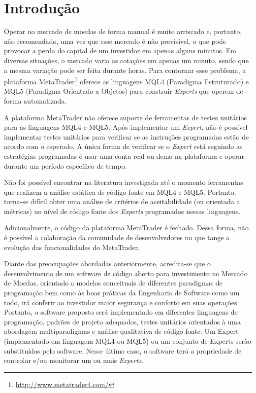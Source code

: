 \chapter{Introdução}

Operar no mercado de moedas de forma manual é muito arriscado e, portanto, não recomendado, uma vez que esse mercado é não previsível, o que pode provocar a perda do capital de um investidor em apenas alguns minutos. Em diversas situações, o mercado varia as cotações em apenas um minuto, sendo que a mesma variação pode ser feita durante horas. Para contornar esse problema, a plataforma MetaTrader\footnote{\url{http://www.metatrader4.com/}} oferece as linguagens MQL4 (Paradigma Estruturado) e MQL5 (Paradigma Orientado a Objetos) para construir \textit{Experts} que operem de forma automatizada. 

A plataforma MetaTrader não oferece suporte de ferramentas de testes unitários para as linguagens MQL4 e MQL5. Após implementar um \textit{Expert}, não é possível implementar testes unitários para verificar se as instruções programadas estão de acordo com o esperado. A única forma de verificar se o \textit{Expert} está seguindo as estratégias programadas é usar uma conta real ou demo na plataforma e operar durante um período específico de tempo.

Não foi possível encontrar na literatura investigada até o momento ferramentas que realizem a análise estática de código fonte em MQL4 e MQL5. Portanto, torna-se difícil obter uma análise de critérios de aceitabilidade (ou orientada a métricas) no nível de código fonte dos \textit{Experts} programados nessas linguagens.

Adicionalmente, o código da plataforma MetaTrader é fechado. Dessa forma, não é possível a colaboração da comunidade de desenvolvedores no que tange a evolução das funcionalidades do MetaTrader.

Diante das preocupações abordadas anteriormente, acredita-se que o desenvolvimento de um software de código aberto para investimento no Mercado de Moedas, orientado a modelos conceituais de diferentes paradigmas de programação bem como às boas práticas da Engenharia de Software como um todo, irá conferir ao investidor maior segurança e conforto em suas operações. Portanto, o software proposto será implementado em diferentes linguagens de programação, padrões de projeto adequados, testes unitários orientados à uma abordagem multiparadigmas e análise qualitativa de código fonte. Um Expert (implementado em linguagem MQL4 ou MQL5) ou um conjunto de Experts serão substituídos pelo software. Nesse último caso, o software terá a propriedade de controlar e/ou monitorar um ou mais \textit{Experts}.

